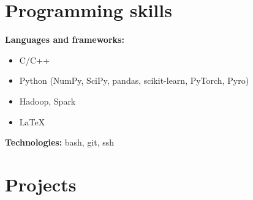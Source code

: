 \documentclass[letterpaper, 11pt]{article}
\begin{document}







\section{Programming skills}

\textbf{Languages and frameworks:}

\vspace{2pt}

\begin{addmargin}[0em]{10em}
    \begin{itemize}
        \setlength\itemsep{-2pt}
        \item C/C++
        \item Python (NumPy, SciPy, pandas, scikit-learn, PyTorch, Pyro)
        \item Hadoop, Spark
        \item \LaTeX
    \end{itemize}
\end{addmargin}

\vspace{4pt}

\textbf{Technologies:} bash, git, ssh

\section{Projects}
\end{document}
